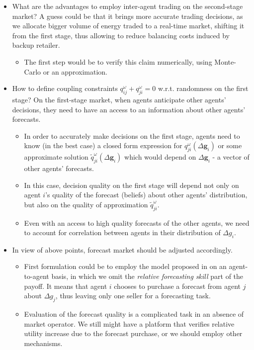 \documentclass{article}
\begin{document}
\begin{itemize}
    \item What are the advantages to employ inter-agent trading on the second-stage market? A guess could be that it brings more accurate trading decisions, as we allocate bigger volume of energy traded to a real-time market, shifting it from the first stage, thus allowing to reduce balancing costs induced by backup retailer.
    \begin{itemize}
        \item The first step would be to verify this claim numerically, using Monte-Carlo or an approximation.
    \end{itemize}
    
    \item How to define coupling constraints $q^{\omega}_{ij} + q^{\omega}_{ji} = 0$ w.r.t. randomness on the first stage? On the first-stage market, when agents anticipate other agents' decisions, they need to have an access to an information about other agents' forecasts. 
    \begin{itemize}
        \item In order to accurately make decisions on the first stage, agents need to know (in the best case) a closed form expression for $q^{\omega}_{ji}(\Delta \mathbf{g}_i)$ or some approximate solution $\tilde{q}^{\omega}_{ji}(\Delta \mathbf{g}_i)$ which would depend on $\Delta \mathbf{g}_i$ - a vector of other agents' forecasts. 
        
        \item In this case, decision quality on the first stage will depend not only on agent $i$'s quality of the forecast (beliefs) about other agents' distribution, but also on the quality of approximation $\tilde{q}^{\omega}_{ji}$.
        
        \item Even with an access to high quality forecasts of the other agents, we need to account for correlation between agents in their distribution of $\Delta g_i$.
    \end{itemize}
    
    \item In view of above points, forecast market should be adjusted accordingly. 
    \begin{itemize}
        \item First formulation could be to employ the model proposed in \cite{raja} on an agent-to-agent basis, in which we omit the {\it relative forecasting skill} part of the payoff. It means that agent $i$ chooses to purchase a forecast from agent $j$ about $\Delta g_j$, thus leaving only one seller for a forecasting task. 
        
        \item Evaluation of the forecast quality is a complicated task in an absence of market operator. We still might have a platform that verifies relative utility increase due to the forecast purchase, or we should employ other mechanisms.
    \end{itemize}
\end{itemize}
\end{document}

